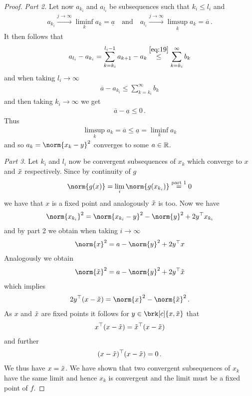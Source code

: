\begin{proof}
\textit{Part 2.}
Let now $a_{k_i}$ and $a_{l_i}$ be subsequences such that $k_i\leq l_i$ and
\begin{align*}
	a_{k_i}\xrightarrow{j\to\infty}\liminf_ka_k=\underline{a} \quad \text{and} \quad
	a_{l_i}\xrightarrow{j\to\infty}\limsup_ka_k=\overline{a}\,.	
\end{align*}
It then follows that
\begin{align*}
	a_{l_i}-a_{k_i}
	= \sum_{k=k_i}^{l_i-1}a_{k+1}-a_k
	\stackrel{\eqref{eq:19}}{\leq} \sum_{k=k_i}^\infty b_k
\end{align*}
and when taking $l_i\to\infty$
\begin{align*}
	\overline{a}-a_{k_i}\leq \sum_{k=k_i}^\infty b_k
\end{align*}
and then taking $k_i\to\infty$ we get
\begin{align*}
	\overline{a}-\underline{a}\leq 0\,.
\end{align*}
Thus
\begin{align*} 
	\limsup_ka_k=\overline{a}\leq \underline{a}=\liminf_ka_k
\end{align*}
and so $a_k=\norm{x_k-y}^2$ converges to some $a\in\mathbb{R}$.

\textit{Part 3.}
Let $k_i$ and $l_i$ now be convergent subsequences of $x_k$ which converge to $x$ and $\tilde{x}$ respectively. Since by continuity of $g$
\begin{align*}
	\norm{g(x)}=\lim_i\norm{g(x_{k_i})}\stackrel{\text{part 1}}{=}0
\end{align*}
we have that $x$ is a fixed point and analogously $\tilde{x}$ is too.
Now we have
\begin{align*}
	\norm{x_{k_i}}^2
	= \norm{x_{k_i}-y}^2-\norm{y}^2+2y^\top x_{k_i}
\end{align*}
and by part 2 we obtain when taking $i\to\infty$
\begin{align*}
	\norm{x}^2
	= a-\norm{y}^2+2y^\top x
\end{align*}
Analogously we obtain
\begin{align*}
	\norm{\tix}^2=a-\norm{y}^2+2y^\top \tix
\end{align*}
which implies
\begin{align*}
	2y^\top(x-\tix) = \norm{x}^2-\norm{\tix}^2\,.
\end{align*}
As $x$ and $\tilde{x}$ are fixed points it follows for $y\in\brk[c]{x,\tix}$ that
\begin{align*}
	x^\top(x-\tilde{x}) = \tilde{x}^\top(x- \tilde{x})
\end{align*}
and further
\begin{align*}
	(x-\tilde{x})^\top(x-\tilde{x}) = 0\,.
\end{align*}
We thus have $x=\tilde{x}$. We have shown that two convergent subsequences of $x_k$ have the same limit and hence $x_k$ is convergent and the limit must be a fixed point of $f$.

\end{proof}


